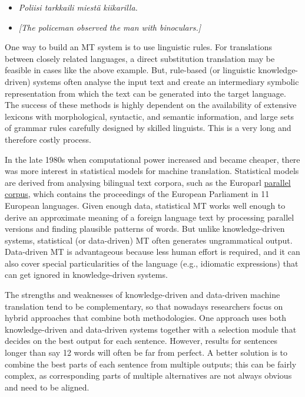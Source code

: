 \documentclass[]{../../metanetpaper}
\begin{document}
\begin{multicols}{2}
\begin{itemize}
\item[] {\foreignlanguage{finnish}{\textit{Poliisi tarkkaili miestä
                kiikarilla.}}} 
\item        \textit{[The policeman observed the man with binoculars.]}
\end{itemize}
One way to build an MT system is to use linguistic rules. For translations
between closely related languages, a direct substitution translation may be
feasible in cases like the above example. But, rule-based (or linguistic
knowledge-driven) systems often analyse the input text and create an
intermediary symbolic representation from which the text can be generated into
the target language. The success of these methods is highly dependent on the
availability of extensive lexicons with morphological, syntactic, and semantic
information, and large sets of grammar rules carefully designed by skilled
linguists. This is a very long and therefore costly process.

In the late 1980s when computational power increased and became cheaper, there
was more interest in statistical models for machine translation. Statistical
models are derived from analysing bilingual text corpora, such as the Europarl
\underline{parallel corpus}, which contains the proceedings of the European Parliament in
11 European languages. Given enough data, statistical MT works well enough to
derive an approximate meaning of a foreign language text by processing parallel
versions and finding plausible patterns of words. But unlike knowledge-driven
systems, statistical (or data-driven) MT often generates ungrammatical output.
Data-driven MT is advantageous because less human effort is required, and it
can also cover special particularities of the language (e.g., idiomatic
expressions) that can get ignored in knowledge-driven systems.


The strengths and weaknesses of knowledge-driven and data-driven machine
translation tend to be complementary, so that nowadays researchers focus on
hybrid approaches that combine both methodologies. One approach uses both
knowledge-driven and data-driven systems together with a selection module that
decides on the best output for each sentence. However, results for sentences
longer than say 12 words will often be far from perfect. A better solution is
to combine the best parts of each sentence from multiple outputs; this can be
fairly complex, as corresponding parts of multiple alternatives are not always
obvious and need to be aligned.


\end{multicols}
\end{document}
